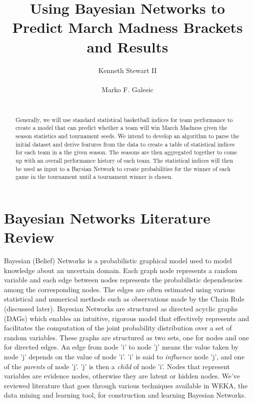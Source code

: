 \documentclass{acm_proc_article-sp}
\begin{document}
\title{Using Bayesian Networks to Predict March Madness Brackets and Results}
\author{
\alignauthor
Kenneth Stewart II\\
       \\
\alignauthor
Marko F. Galesic\\
       \\
}
\maketitle
\begin{abstract}
Generally, we will use standard statistical basketball indices for team performance to create a 
model that can predict whether a team will win March Madness given the season statistics and 
tournament seeds. We intend to develop an algorithm to parse the initial dataset and derive features 
from the data to create a table of statistical indices for each team in a the given season. The seasons 
are then aggregated together to come up with an overall performance history of each team. The 
statistical indices will then be used as input to a Baysian Network to create probabilities for the
winner of each game in the tournament until a tournament winner is chosen.
\end{abstract}
\section{Bayesian Networks Literature Review}
Bayesian (Belief) Networks is a probabilistic graphical model used to model knowledge about an 
uncertain domain. Each graph node represents a random variable and each edge between nodes 
represents the probabilistic dependencies among the corresponding nodes\cite{heckerman}.
The edges are often estimated using various statistical and numerical methods such as observations 
made by the Chain Rule (discussed later).\cite{wagner, tan} 
Bayesian Networks are structured as directed acyclic graphs (DAGs) which enables an intuitive, rigorous model that effectively represents and facilitates the computation of the joint probability distribution over a set of random variables\cite{heckerman}. These graphs are structured as two sets, one for nodes and one for directed edges. An edge from node 'i' to node 'j' means the value taken by node 'j' depends on the value of node 'i'. 'i' is said to \emph{influence} node 'j', and one of the \emph{parents} of node 'j'. 'j' is then a \emph{child} of node 'i'\cite{heckerman}. Nodes that represent variables are evidence nodes, otherwise they are latent or hidden nodes. We've reviewed literature that goes through various techniques available in WEKA, the data mining and learning tool, for construction and learning Bayesian Networks.\cite{weka}
\newpage
\end{document}
